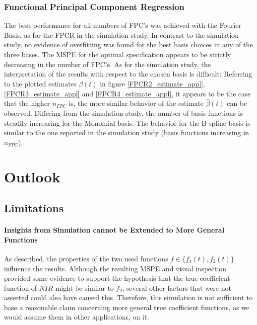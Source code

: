 \documentclass[11pt,twoside,a4paper]{article}
\begin{document}
		\subsubsection{Functional Principal Component Regression}
		The best performance for all numbers of FPC's was achieved with the Fourier Basis, as for the FPCR in the simulation study. In contrast to the simulation study, no evidence of overfitting was found for the best basis choices in any of the three bases. The MSPE for the optimal specification appears to be strictly decreasing in the number of FPC's. As for the simulation study, the interpretation of the results with respect to the chosen basis is difficult: Referring to the plotted estimates $\hat{\beta}(t)$ in figure  \ref{FPCR2_estimate_appl}, \ref{FPCR3_estimate_appl} and \ref{FPCR4_estimate_appl}, it appears to be the case that the higher $n_{FPC}$ is, the more similar behavior of the estimate $\hat{\beta}(t)$ can be observed. Differing from the simulation study, the number of basis functions is steadily increasing for the Monomial basis. The behavior for the B-spline basis is similar to the one reported in the simulation study (basis functions increasing in $n_{FPC}$). 
	


	\section{Outlook}\label{Outlook}
	
	\subsection*{Limitations}
	
	\paragraph{Insights from Simulation cannot be Extended to More General Functions}
	As described, the properties of the two used functions $f \in \{f_1(t), f_2(t)\}$ influence the results. Although the resulting MSPE and visual inspection provided some evidence to support the hypothesis that the true coefficient function of $NIR$ might be similar to $f_2$, several other factors that were not asserted could also have caused this. Therefore, this simulation is not sufficient to base a reasonable claim concerning more general true coefficient functions, as we would assume them in other applications, on it.
	\vspace{-0.2cm}
	
\end{document}
